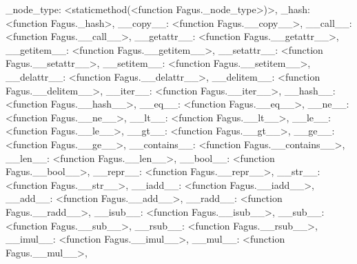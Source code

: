 \documentclass[a4paper,10pt,english]{sphinxmanual}
\begin{document}
\begin{fulllineitems}
\begin{fulllineitems}
\textquotesingle{}\_node\_type\textquotesingle{}: \textless{}staticmethod(\textless{}function Fagus.\_node\_type\textgreater{})\textgreater{}, \textquotesingle{}\_hash\textquotesingle{}: \textless{}function Fagus.\_hash\textgreater{}, \textquotesingle{}\_\_copy\_\_\textquotesingle{}: \textless{}function Fagus.\_\_copy\_\_\textgreater{}, \textquotesingle{}\_\_call\_\_\textquotesingle{}: \textless{}function Fagus.\_\_call\_\_\textgreater{}, \textquotesingle{}\_\_getattr\_\_\textquotesingle{}: \textless{}function Fagus.\_\_getattr\_\_\textgreater{}, \textquotesingle{}\_\_getitem\_\_\textquotesingle{}: \textless{}function Fagus.\_\_getitem\_\_\textgreater{}, \textquotesingle{}\_\_setattr\_\_\textquotesingle{}: \textless{}function Fagus.\_\_setattr\_\_\textgreater{}, \textquotesingle{}\_\_setitem\_\_\textquotesingle{}: \textless{}function Fagus.\_\_setitem\_\_\textgreater{}, \textquotesingle{}\_\_delattr\_\_\textquotesingle{}: \textless{}function Fagus.\_\_delattr\_\_\textgreater{}, \textquotesingle{}\_\_delitem\_\_\textquotesingle{}: \textless{}function Fagus.\_\_delitem\_\_\textgreater{}, \textquotesingle{}\_\_iter\_\_\textquotesingle{}: \textless{}function Fagus.\_\_iter\_\_\textgreater{}, \textquotesingle{}\_\_hash\_\_\textquotesingle{}: \textless{}function Fagus.\_\_hash\_\_\textgreater{}, \textquotesingle{}\_\_eq\_\_\textquotesingle{}: \textless{}function Fagus.\_\_eq\_\_\textgreater{}, \textquotesingle{}\_\_ne\_\_\textquotesingle{}: \textless{}function Fagus.\_\_ne\_\_\textgreater{}, \textquotesingle{}\_\_lt\_\_\textquotesingle{}: \textless{}function Fagus.\_\_lt\_\_\textgreater{}, \textquotesingle{}\_\_le\_\_\textquotesingle{}: \textless{}function Fagus.\_\_le\_\_\textgreater{}, \textquotesingle{}\_\_gt\_\_\textquotesingle{}: \textless{}function Fagus.\_\_gt\_\_\textgreater{}, \textquotesingle{}\_\_ge\_\_\textquotesingle{}: \textless{}function Fagus.\_\_ge\_\_\textgreater{}, \textquotesingle{}\_\_contains\_\_\textquotesingle{}: \textless{}function Fagus.\_\_contains\_\_\textgreater{}, \textquotesingle{}\_\_len\_\_\textquotesingle{}: \textless{}function Fagus.\_\_len\_\_\textgreater{}, \textquotesingle{}\_\_bool\_\_\textquotesingle{}: \textless{}function Fagus.\_\_bool\_\_\textgreater{}, \textquotesingle{}\_\_repr\_\_\textquotesingle{}: \textless{}function Fagus.\_\_repr\_\_\textgreater{}, \textquotesingle{}\_\_str\_\_\textquotesingle{}: \textless{}function Fagus.\_\_str\_\_\textgreater{}, \textquotesingle{}\_\_iadd\_\_\textquotesingle{}: \textless{}function Fagus.\_\_iadd\_\_\textgreater{}, \textquotesingle{}\_\_add\_\_\textquotesingle{}: \textless{}function Fagus.\_\_add\_\_\textgreater{}, \textquotesingle{}\_\_radd\_\_\textquotesingle{}: \textless{}function Fagus.\_\_radd\_\_\textgreater{}, \textquotesingle{}\_\_isub\_\_\textquotesingle{}: \textless{}function Fagus.\_\_isub\_\_\textgreater{}, \textquotesingle{}\_\_sub\_\_\textquotesingle{}: \textless{}function Fagus.\_\_sub\_\_\textgreater{}, \textquotesingle{}\_\_rsub\_\_\textquotesingle{}: \textless{}function Fagus.\_\_rsub\_\_\textgreater{}, \textquotesingle{}\_\_imul\_\_\textquotesingle{}: \textless{}function Fagus.\_\_imul\_\_\textgreater{}, \textquotesingle{}\_\_mul\_\_\textquotesingle{}: \textless{}function Fagus.\_\_mul\_\_\textgreater{}, 
\end{fulllineitems}
\end{fulllineitems}
\end{document}
